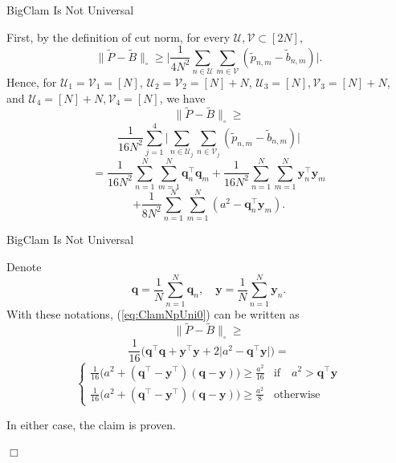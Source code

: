 \documentclass{beamer}
\begin{document}
\begin{frame}{BigClam Is Not Universal}
    
First, by the definition of cut norm, for every $\mathcal{U},\mathcal{V}\subset[2N]$,
\[\| \tilde{P}-\tilde{B}\|_{\square} \geq \Big|\frac{1}{4N^2}\sum_{n\in \mathcal{U}}\sum_{m\in \mathcal{V}} (\tilde{p}_{n,m} - \tilde{b}_{n,m})\Big|.\]
Hence, for $\mathcal{U}_1=\mathcal{V}_1=[N]$, $\mathcal{U}_2=\mathcal{V}_2=[N]+N$, $\mathcal{U}_3=[N],\mathcal{V}_3=[N]+N$, and $\mathcal{U}_4=[N]+N,\mathcal{V}_4=[N]$, we have
\[\| \tilde{P}-\tilde{B}\|_{\square} \geq \]
\[\frac{1}{16N^2}\sum_{j=1}^4 \Big|\sum_{n\in \mathcal{U}_j}\sum_{n\in \mathcal{V}_j} (\tilde{p}_{n,m} - \tilde{b}_{n,m})\Big| \]
\[= \frac{1}{16N^2}\sum_{n=1}^N\sum_{m=1}^{N} \mathbf{q}_n^\top \mathbf{q}_m  + \frac{1}{16N^2}\sum_{n=1}^N\sum_{m=1}^{N} \mathbf{y}_n^\top \mathbf{y}_m \]
\begin{equation}
    \label{eq:ClamNpUni0}
    +\frac{1}{8N^2}\sum_{n=1}^N\sum_{m=1}^{N} ( a^2 -\mathbf{q}_n^\top \mathbf{y}_m).
\end{equation}
\end{frame}

\begin{frame}{BigClam Is Not Universal}
    
Denote 
\[\mathbf{q}=\frac{1}{N}\sum_{n=1}^N \mathbf{q}_n, \quad \mathbf{y}=\frac{1}{N}\sum_{n=1}^N \mathbf{y}_n.\]
With these notations, (\ref{eq:ClamNpUni0}) can be written as
\[\| \tilde{P}-\tilde{B}\|_{\square} \geq \]
\[\frac{1}{16}\bigg(\mathbf{q}^\top \mathbf{q}  + \mathbf{y}^\top \mathbf{y} +2\Big|a^2 -\mathbf{q}^\top \mathbf{y}\Big|\bigg) = \]
\begin{equation*}
\begin{cases}
    
\frac{1}{16}\Big(a^2 + (\mathbf{q}^\top-\mathbf{y}^\top)(\mathbf{q}-\mathbf{y})\Big) \geq \frac{a^2}{16} & \text{if} \quad a^2 > \mathbf{q}^\top \mathbf{y} \\
\frac{1}{16}\Big(a^2 + (\mathbf{q}^\top-\mathbf{y}^\top)(\mathbf{q}-\mathbf{y})\Big) \geq \frac{a^2}{8} & \text{otherwise} 
\end{cases}
\end{equation*}

In either case, the claim is proven. 
\begin{flushright}
$\Box$
\end{flushright}
\end{frame}
\end{document}
